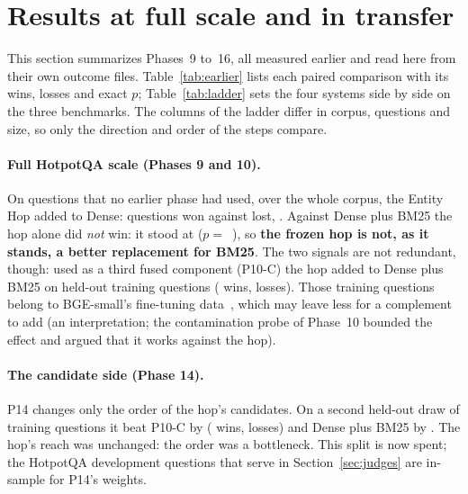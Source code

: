 \section{Results at full scale and in transfer}
\label{sec:scale}

This section summarizes Phases~9 to~16, all measured earlier and read here from their own outcome
files. Table~\ref{tab:earlier} lists each paired comparison with its wins, losses and exact $p$;
Table~\ref{tab:ladder} sets the four systems side by side on the three benchmarks. The columns of
the ladder differ in corpus, questions and size, so only the direction and order of the steps
compare.

\paragraph{Full HotpotQA scale (Phases 9 and 10).} On \nPhNineHop{} questions that no earlier phase had
used, over the whole corpus, the Entity Hop added to Dense: \winsPhNineHop{} questions won against
\lossesPhNineHop{} lost, \deltaPhNineHop\pp. Against Dense plus BM25 the hop alone did
\emph{not} win: it stood at \deltaPhNineBm\pp{} ($p=$~\pPhNineBm{}), so \textbf{the frozen hop is
not, as it stands, a better replacement for BM25}. The two signals are not redundant, though:
used as a third fused component (P10-C) the hop added \deltaPhTenThree\pp{} to Dense plus BM25 on
\nPhTenThree{} held-out training questions (\winsPhTenThree{} wins, \lossesPhTenThree{} losses). Those
training questions belong to BGE-small's fine-tuning data~\citep{xiao2024cpack}, which may leave less for a
complement to add (an interpretation; the contamination probe of Phase~10 bounded the effect and argued that
it works against the hop).

\paragraph{The candidate side (Phase 14).} P14 changes only the order of the hop's candidates.
On a second held-out draw of \nPhFourteenPTenC{} training questions it beat P10-C by
\deltaPhFourteenPTenC\pp{} (\winsPhFourteenPTenC{} wins, \lossesPhFourteenPTenC{} losses) and Dense plus BM25 by
\deltaPhFourteenPTenB\pp. The hop's reach was unchanged: the order was a bottleneck. This split is
now spent; the HotpotQA development questions that serve in Section~\ref{sec:judges} are in-sample
for P14's weights.

